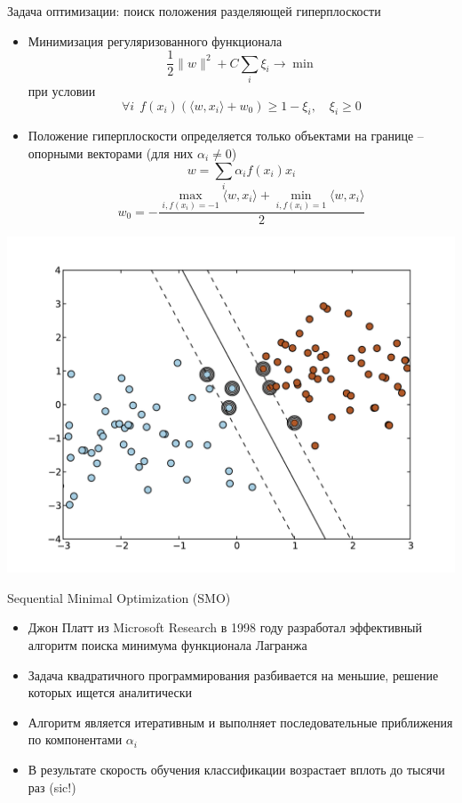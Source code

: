 \documentclass[red,unicode]{beamer}
\begin{document}
\begin{frame}{Задача оптимизации: поиск положения разделяющей гиперплоскости}
\begin{itemize}
\item Минимизация регуляризованного функционала
$$
\frac{1}{2} \| w \|^2 + C \sum_i \xi_i \to \min
$$
при условии
$$
\forall i ~~ f(x_i) (\langle w, x_i\rangle + w_0 ) \geq 1 - \xi_i,\quad \xi_i \geq 0
$$
	\item Положение гиперплоскости определяется только объектами на границе -- опорными векторами (для них $\alpha_i \ne 0$)
	$$
	w = \sum_i \alpha_i f(x_i) x_i
	$$
	$$
	w_0 = - \frac{\max_{i, f(x_i) = -1} \langle w,x_i \rangle + \min_{i, f(x_i) = 1} \langle w,x_i \rangle}{2}
	$$
\end{itemize}
\end{frame}

\begin{frame}{}
\includegraphics[width=\textwidth]{SVM-separable}
\end{frame}

%

\begin{frame}{Sequential Minimal Optimization (SMO)}
\begin{itemize}
	\item Джон Платт из Microsoft Research в 1998 году разработал эффективный алгоритм поиска минимума функционала Лагранжа
	\item Задача квадратичного программирования разбивается на меньшие, решение которых ищется аналитически
	\item Алгоритм является итеративным и выполняет последовательные приближения по компонентами $\alpha_i$
	\item В результате скорость обучения классификации возрастает вплоть до тысячи раз (sic!)
\end{itemize}
\end{frame}
\end{document}
